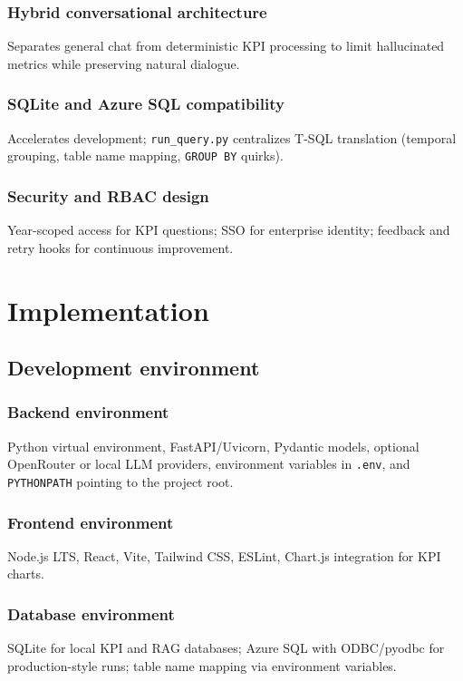 \documentclass[12pt,a4paper,openany]{report}
\begin{document}
\subsection{Hybrid conversational architecture}
Separates general chat from deterministic KPI processing to limit hallucinated metrics while preserving natural dialogue.

\subsection{SQLite and Azure SQL compatibility}
Accelerates development; \texttt{run\_query.py} centralizes T-SQL translation (temporal grouping, table name mapping, \texttt{GROUP BY} quirks).

\subsection{Security and RBAC design}
Year-scoped access for KPI questions; SSO for enterprise identity; feedback and retry hooks for continuous improvement.

\chapter{Implementation}

\section{Development environment}
\subsection{Backend environment}
Python virtual environment, FastAPI/Uvicorn, Pydantic models, optional OpenRouter or local LLM providers, environment variables in \texttt{.env}, and \texttt{PYTHONPATH} pointing to the project root.

\subsection{Frontend environment}
Node.js LTS, React, Vite, Tailwind CSS, ESLint, Chart.js integration for KPI charts.

\subsection{Database environment}
SQLite for local KPI and RAG databases; Azure SQL with ODBC/pyodbc for production-style runs; table name mapping via environment variables.
\end{document}
